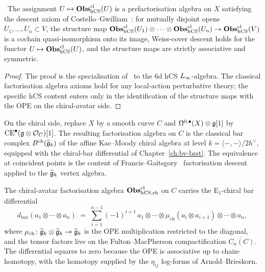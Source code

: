 \begin{theorem}
\label{thm:hcs-obs-cl-is-factorisation}
%
\ClaimStatusProvedElsewhere\,\cite[Ch.\,3,\,5]{CostelloGwilliam2017}
The assignment $U\mapsto\mathbf{Obs}^{\mathrm{cl}}_{\mathrm{hCS}}(U)$ is a
prefactorisation algebra on $X$ satisfying the descent axiom of
Costello--Gwilliam~\cite[Def.\,3.1.4]{CostelloGwilliam2017}: for
mutually disjoint opens $U_1,\ldots,U_n\subset V$, the structure map
$\mathbf{Obs}^{\mathrm{cl}}_{\mathrm{hCS}}(U_1)\otimes\cdots
\otimes\mathbf{Obs}^{\mathrm{cl}}_{\mathrm{hCS}}(U_n)\to\mathbf{Obs}^{\mathrm{cl}}_{\mathrm{hCS}}(V)$
is a cochain quasi-isomorphism onto its image, Weiss-cover descent
holds for the functor $U\mapsto\mathbf{Obs}^{\mathrm{cl}}_{\mathrm{hCS}}(U)$, and the
structure maps are strictly associative and symmetric.
\end{theorem}

\begin{proof}
The proof is the specialisation of~\cite[Ch.\,5,\,Thm.\,5.3.6]{CostelloGwilliam2017}
to the 6d hCS $L_\infty$-algebra. The classical factorisation algebra
axioms hold for any local-action perturbative theory; the specific hCS
content enters only in the identification of the structure maps with
the OPE on the chiral-avatar side.
\end{proof}

\begin{remark}[Chiral avatar: $\Fobs^{\mathrm{cl}}_{\hCS,\mathrm{ch}}
 = B^{\mathrm{ch}}(\widehat\fg_k)$]
\label{rem:chiral-avatar-obs-cl}
On the chiral side, replace $X$ by a smooth curve $C$ and
$\Omega^{0,\bullet}(X)\otimes\mathfrak{g}[1]$ by $\mathrm{CE}^\bullet(\mathfrak{g}\otimes\mathcal{O}_C)[1]$. The
resulting factorisation algebra on $C$ is the classical bar complex
$B^{\mathrm{ch}}(\widehat{\mathfrak{g}}_k)$ of the affine Kac--Moody chiral
algebra at level $k = \langle-,-\rangle/2h^\vee$, equipped with the
chiral-bar differential of
Chapter~\ref{ch:bv-brst}. The equivalence at coincident
points is the content of Francis--Gaitsgory~\cite{FG12} factorisation
descent applied to the $\widehat{\mathfrak{g}}_k$ vertex algebra.
\end{remark}

\begin{theorem}
\label{thm:hcs-chiral-bar-differential}
%
The chiral-avatar factorisation algebra
$\mathbf{Obs}^{\mathrm{cl}}_{\mathrm{hCS},\mathrm{ch}}$ on $C$ carries the
E$_1$-chiral bar differential
\begin{equation}
\label{eq:chiral-bar-differential-hcs}
 d_{\mathrm{bar}}(a_1\otimes\cdots\otimes a_n)
 \;=\;
 \sum_{i=1}^{n-1}(-1)^{i+1}\,a_1\otimes\cdots
 \otimes\mu_{\mathrm{ch}}(a_i\otimes a_{i+1})
 \otimes\cdots\otimes a_n,
\end{equation}
where $\mu_{\mathrm{ch}}\colon\widehat{\mathfrak{g}}_k\otimes\widehat{\mathfrak{g}}_k
\to\widehat{\mathfrak{g}}_k$ is the OPE multiplication restricted to the
diagonal, and the tensor factors live on the
Fulton--MacPherson compactification $\overline{C_n(C)}$. The
differential squares to zero because the OPE is associative up to
chain-homotopy, with the homotopy supplied by the $\eta_{ij}$
log-forms of Arnold--Brieskorn.
\end{theorem}

